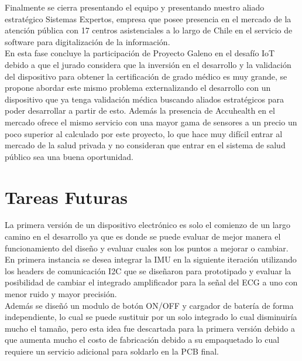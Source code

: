 Finalmente se cierra presentando el equipo y presentando nuestro aliado estratégico Sistemas Expertos, empresa que posee presencia en el mercado de la atención pública con 17 centros asistenciales a lo largo de Chile en el servicio de software para digitalización de la información.\\
En esta fase concluye la participación de Proyecto Galeno en el desafío IoT debido a que el jurado considera que la inversión en el desarrollo y la validación del dispositivo para obtener la certificación de grado médico es muy grande, se propone abordar este mismo problema externalizando el desarrollo con un dispositivo que ya tenga validación médica buscando aliados estratégicos para poder desarrollar a partir de esto. Además la presencia de Accuhealth en el mercado ofrece el mismo servicio con una mayor gama de sensores a un precio un poco superior al calculado por este proyecto, lo que hace muy difícil entrar al mercado de la salud privada y no consideran que entrar en el sistema de salud público sea una buena oportunidad.
\newpage
\section{Tareas Futuras}

La primera versión de un dispositivo electrónico es solo el comienzo de un largo camino en el desarrollo ya que es donde se puede evaluar de mejor manera el funcionamiento del diseño y evaluar cuales son los puntos a mejorar o cambiar. \\
En primera instancia se desea integrar la IMU en la siguiente iteración utilizando los headers de comunicación I2C que se diseñaron para prototipado y evaluar la posibilidad de cambiar el integrado amplificador para la señal del ECG a uno con menor ruido y mayor precisión. \\
Además se diseñó un modulo de botón ON/OFF y cargador de batería de forma independiente, lo cual se puede sustituir por un solo integrado lo cual disminuiría mucho el tamaño, pero esta idea fue descartada para la primera versión debido a que aumenta mucho el costo de fabricación debido a su empaquetado lo cual requiere un servicio adicional para soldarlo en la PCB final.\\
